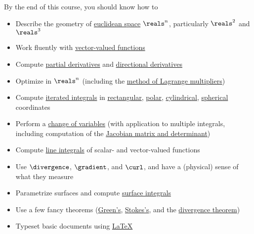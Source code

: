 By the end of this course, you should know how to
\begin{itemize}
\item Describe the geometry of \href{https://en.wikipedia.org/wiki/Euclidean\_space}{euclidean space} $\reals^{n}$, particularly $\reals^{2}$ and $\reals^{3}$
\item Work fluently with \href{https://en.wikipedia.org/wiki/Vector-valued\_function}{vector-valued functions}
\item Compute \href{https://en.wikipedia.org/wiki/Partial\_derivative}{partial derivatives} and \href{https://en.wikipedia.org/wiki/Directional\_derivative}{directional derivatives}
\item Optimize in $\reals^{n}$ (including the \href{https://en.wikipedia.org/wiki/Lagrange\_multiplier}{method of Lagrange multipliers})
\item Compute \href{https://en.wikipedia.org/wiki/Iterated\_integral}{iterated integrals} in \href{https://en.wikipedia.org/wiki/Cartesian\_coordinate\_system\#Two\_dimensions}{rectangular}, \href{https://en.wikipedia.org/wiki/Polar\_coordinate\_system}{polar}, \href{https://en.wikipedia.org/wiki/Cylindrical\_coordinate\_system}{cylindrical}, \href{https://en.wikipedia.org/wiki/Spherical\_coordinate\_system}{spherical} coordinates
\item Perform a \href{https://en.wikipedia.org/wiki/Change\_of\_variables}{change of variables} (with application to multiple integrals, including computation of the \href{https://en.wikipedia.org/wiki/Jacobian\_matrix\_and\_determinant}{Jacobian matrix and determinant})
\item Compute \href{https://en.wikipedia.org/wiki/Line\_integral}{line integrals} of scalar- and vector-valued functions
\item Use \href{https://en.wikipedia.org/wiki/Divergence}{$\divergence$}, \href{https://en.wikipedia.org/wiki/Gradient}{$\gradient$}, and \href{https://en.wikipedia.org/wiki/Curl_(mathematics)}{$\curl$}, and have a (physical) sense of what they measure
\item Parametrize surfaces and compute \href{https://en.wikipedia.org/wiki/Surface\_integral}{surface integrals}
\item Use a few fancy theorems (\href{https://en.wikipedia.org/wiki/Green\%27s\_theorem}{Green's}, \href{https://en.wikipedia.org/wiki/Stokes\%27\_theorem\#Kelvin.E2.80.93Stokes\_theorem}{Stokes's}, and the \href{https://en.wikipedia.org/wiki/Divergence\_theorem}{divergence theorem})
\item Typeset basic documents using \href{https://en.wikipedia.org/wiki/LaTeX}{\LaTeX{}}
\end{itemize}




